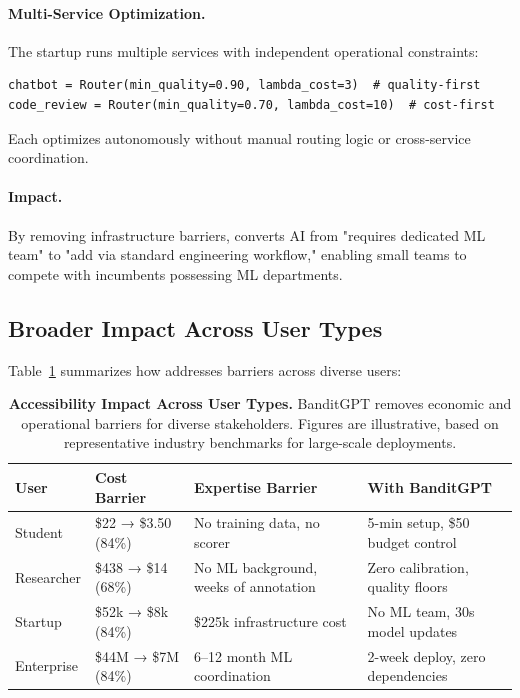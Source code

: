 \paragraph{Multi-Service Optimization.} The startup runs multiple services with independent operational constraints:

\begin{small}
\begin{verbatim}
chatbot = Router(min_quality=0.90, lambda_cost=3)  # quality-first
code_review = Router(min_quality=0.70, lambda_cost=10)  # cost-first
\end{verbatim}
\end{small}

Each optimizes autonomously without manual routing logic or cross-service coordination.

\paragraph{Impact.} By removing infrastructure barriers, \ours{} converts AI from "requires dedicated ML team" to "add via standard engineering workflow," enabling small teams to compete with incumbents possessing ML departments.

\subsection{Broader Impact Across User Types}

Table~\ref{tab:use_case_summary} summarizes how \ours{} addresses barriers across diverse users:

\begin{table}[t]
\centering
\small
\caption{\textbf{Accessibility Impact Across User Types.} BanditGPT removes economic and operational barriers for diverse stakeholders. Figures are illustrative, based on representative industry benchmarks for large-scale deployments.}
\label{tab:use_case_summary}
\begin{tabular}{p{1.2cm}p{1.5cm}p{1.5cm}p{2.5cm}}
\toprule
\textbf{User} & \textbf{Cost Barrier} & \textbf{Expertise Barrier} & \textbf{With BanditGPT} \\
\midrule
Student & \$22 → \$3.50 (84\%) & No training data, no scorer & 5-min setup, \$50 budget control \\
Researcher & \$438 → \$14 (68\%) & No ML background, weeks of annotation & Zero calibration, quality floors \\
Startup & \$52k → \$8k (84\%) & \$225k infrastructure cost & No ML team, 30s model updates \\
Enterprise & \$44M → \$7M (84\%) & 6--12 month ML coordination & 2-week deploy, zero dependencies \\
\bottomrule
\end{tabular}
\end{table}

